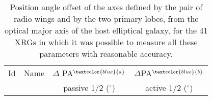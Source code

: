 \documentclass[twocolumn]{aastex62}
\begin{document}
 \begin{table}
 \centering
 \begin{minipage}{85mm}
 {\scriptsize
 \caption{Position angle offset of the axes defined by the pair of radio
 wings and by the two primary lobes, from the optical major axis of the 
 host elliptical galaxy, for the 41 XRGs in which it was possible to 
 measure all these parameters with reasonable accuracy.}
 \label{tab:deltapa}
 \begin{tabular}{@{} r c r  r  @{}}
 \hline  \hline 
  \multicolumn{1}{c}{Id}   &\multicolumn{1}{c}{Name}  &     \multicolumn{1}{c}{$\Delta$ PA$^{\textcolor{blue}{a}}$ }& \multicolumn{1}{c}{$\Delta$PA$^{\textcolor{blue}{b}}$} \\
  \multicolumn{1}{c}{  }   &\multicolumn{1}{c}{   }  &      \multicolumn{1}{c}{ passive 1/2 ($^{\circ}$)     } & \multicolumn{1}{c}{ active 1/2 ($^{\circ}$)  } \\
\hline 


\end{tabular}}
\end{minipage}
\end{table}
\end{document}
